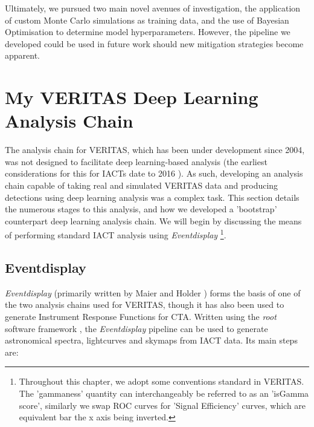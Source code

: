 Ultimately, we pursued two main novel avenues of investigation, the application of custom Monte Carlo simulations as training data, and the use of Bayesian Optimisation to determine model hyperparameters. However, the pipeline we developed could be used in future work should new mitigation strategies become apparent.

\section{My VERITAS Deep Learning Analysis Chain}
The analysis chain for VERITAS, which has been under development since 2004, was not designed to facilitate deep learning-based analysis (the earliest considerations for this for IACTs date to 2016 \cite{feng2016}). As such, developing an analysis chain capable of taking real and simulated VERITAS data and producing detections using deep learning analysis was a complex task. This section details the numerous stages to this analysis, and how we developed a 'bootstrap' counterpart deep learning analysis chain. We will begin by discussing the means of performing standard IACT analysis using \textit{Eventdisplay} \footnote{Throughout this chapter, we adopt some conventions standard in VERITAS. The 'gammaness' quantity can interchangeably be referred to as an 'isGamma score', similarly we swap ROC curves for 'Signal Efficiency' curves, which are equivalent bar the x axis being inverted.}.

\subsection{Eventdisplay}

\textit{Eventdisplay} (primarily written by Maier and Holder \cite{evdisp}) forms the basis of one of the two analysis chains used for VERITAS, though it has also been used to generate Instrument Response Functions for CTA. Written using the \textit{root} software framework \cite{root}, the \textit{Eventdisplay} pipeline can be used to generate astronomical spectra, lightcurves and skymaps from IACT data. Its main steps are:

